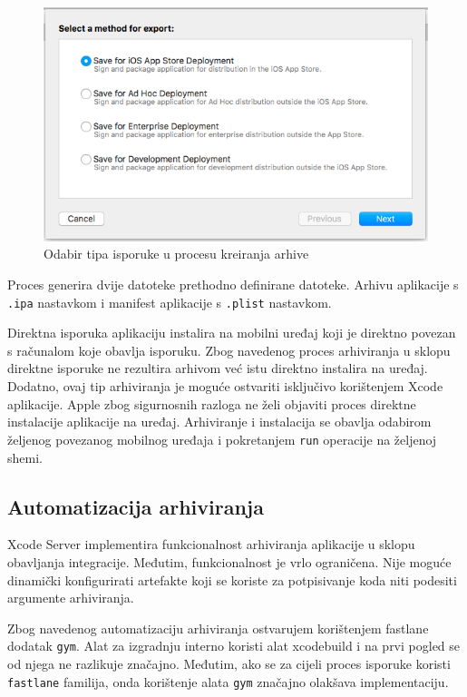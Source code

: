 \documentclass[times, utf8, diplomski, numeric]{fer}
\begin{document}
\begin{figure}
\centering
\includegraphics[scale=0.6]{XcodeArchiveOptions}
\caption{Odabir tipa isporuke u procesu kreiranja arhive}
\label{fig:XcodeArchiveOptions}
\end{figure}

Proces generira dvije datoteke prethodno definirane datoteke. Arhivu aplikacije s \verb|.ipa| nastavkom i manifest aplikacije s \verb|.plist| nastavkom.

Direktna isporuka aplikaciju instalira na mobilni uređaj koji je direktno povezan s računalom koje obavlja isporuku. Zbog navedenog proces arhiviranja u sklopu direktne isporuke ne rezultira arhivom već istu direktno instalira na uređaj. Dodatno, ovaj tip arhiviranja je moguće ostvariti isključivo korištenjem Xcode aplikacije. Apple zbog sigurnosnih razloga ne želi objaviti proces direktne instalacije aplikacije na uređaj. Arhiviranje i instalacija se obavlja odabirom željenog povezanog mobilnog uređaja i pokretanjem \verb|run| operacije na željenoj shemi.

\subsection{Automatizacija arhiviranja}

Xcode Server implementira funkcionalnost arhiviranja aplikacije u sklopu obavljanja integracije. Međutim, funkcionalnost je vrlo ograničena. Nije moguće dinamički konfigurirati artefakte koji se koriste za potpisivanje koda niti podesiti argumente arhiviranja.

Zbog navedenog automatizaciju arhiviranja ostvarujem korištenjem fastlane dodatak \verb|gym|. Alat za izgradnju interno koristi alat xcodebuild i na prvi pogled se od njega ne razlikuje značajno. Međutim, ako se za cijeli proces isporuke koristi \verb|fastlane| familija, onda korištenje alata \verb|gym| značajno olakšava implementaciju.
\end{document}

